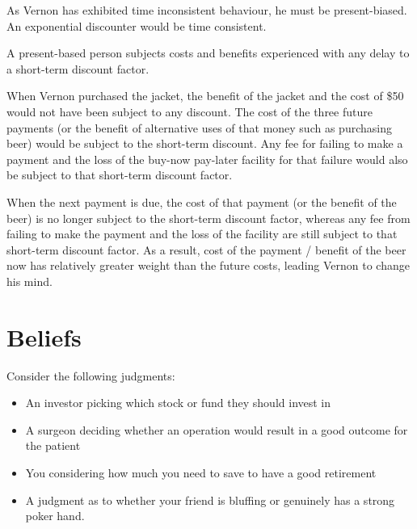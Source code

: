 \documentclass[
  letterpaper,
  DIV=11,
  numbers=noendperiod]{scrreprt}
\begin{document}
\begin{tcolorbox}[enhanced jigsaw, title=\textcolor{quarto-callout-tip-color}{\faLightbulb}\hspace{0.5em}{Answer}, toprule=.15mm, colback=white, breakable, titlerule=0mm, colframe=quarto-callout-tip-color-frame, coltitle=black, opacityback=0, rightrule=.15mm, colbacktitle=quarto-callout-tip-color!10!white, bottomtitle=1mm, opacitybacktitle=0.6, arc=.35mm, bottomrule=.15mm, toptitle=1mm, leftrule=.75mm, left=2mm]

As Vernon has exhibited time inconsistent behaviour, he must be
present-biased. An exponential discounter would be time consistent.

A present-based person subjects costs and benefits experienced with any
delay to a short-term discount factor.

When Vernon purchased the jacket, the benefit of the jacket and the cost
of \$50 would not have been subject to any discount. The cost of the
three future payments (or the benefit of alternative uses of that money
such as purchasing beer) would be subject to the short-term discount.
Any fee for failing to make a payment and the loss of the buy-now
pay-later facility for that failure would also be subject to that
short-term discount factor.

When the next payment is due, the cost of that payment (or the benefit
of the beer) is no longer subject to the short-term discount factor,
whereas any fee from failing to make the payment and the loss of the
facility are still subject to that short-term discount factor. As a
result, cost of the payment / benefit of the beer now has relatively
greater weight than the future costs, leading Vernon to change his mind.

\end{tcolorbox}

\part{Beliefs}

Consider the following judgments:

\begin{itemize}
\item
  An investor picking which stock or fund they should invest in
\item
  A surgeon deciding whether an operation would result in a good outcome
  for the patient
\item
  You considering how much you need to save to have a good retirement
\item
  A judgment as to whether your friend is bluffing or genuinely has a
  strong poker hand.
\end{itemize}
\end{document}
